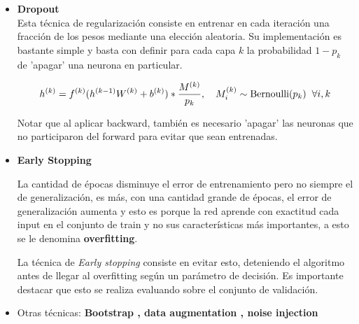 \documentclass[handout, 9pt]{beamer}
\begin{document}
\begin{frame}
\begin{itemize}
  \item \textbf{Dropout} \\ 

  Esta técnica de regularización consiste en entrenar en cada iteración una fracción de los pesos mediante una elección aleatoria. Su implementación es bastante simple y basta con definir para cada capa $k$ la probabilidad $1-p_k$ de 'apagar' una neurona en particular. \pause

    \[
    h^{(k)} = f^{(k)}(h^{(k-1)}W^{(k)} + b^{(k)}) *  \frac{M^{(k)}}{p_k}, \quad M^{(k)}_i \sim \text{Bernoulli}(p_k) \hspace{0.2cm} \forall i,k
    \]

  Notar que al aplicar backward, también es necesario 'apagar' las neuronas que no participaron del forward para evitar que sean entrenadas. \pause

  \item \textbf{Early Stopping} \pause

  La cantidad de épocas disminuye el error de entrenamiento pero no siempre el de generalización, es más, con una cantidad grande de épocas, el error de generalización aumenta y esto es porque la red aprende con exactitud cada input en el conjunto de train y no sus características más importantes, a esto se le denomina \textbf{overfitting}. \\ \pause

  La técnica de \textit{Early stopping} consiste en evitar esto, deteniendo el algoritmo antes de llegar al overfitting según un parámetro de decisión. Es importante destacar que esto se realiza evaluando sobre el conjunto de validación. \pause

  \item Otras técnicas: \textbf{Bootstrap , data augmentation , noise injection}


\end{itemize}


\end{frame}

\begin{frame}
  \titlepage
\end{frame}






%
\end{document}
